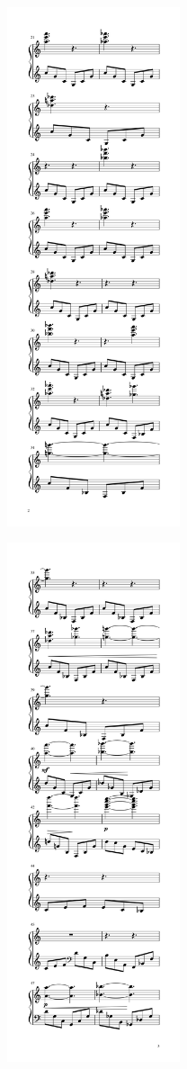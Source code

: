\begin{paracol}{2}
\begin{rightcolumn*}
\noindent\includegraphics[width=2in]{assets/static/miniatures/4-2.png}

\noindent\includegraphics[width=2in]{assets/static/miniatures/4-3.png}


\end{rightcolumn*}
\end{paracol}
